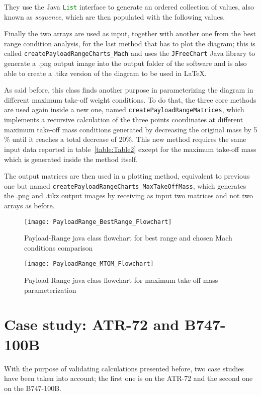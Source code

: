 They use the Java \lstinline[language=Java]!List! interface to generate an ordered collection of values, also known as \emph{sequence}, which are then populated with the following values.

\bigskip
Finally the two arrays are used as input, together with another one from the best range condition analysis, for the last method that has to plot the diagram; this is called \lstinline[language=Java]!createPayloadRangeCharts_Mach! and uses the \lstinline[language=Java]!JFreeChart! Java library to generate a .png output image into the output folder of the software and is also able to create a .tikz version of the diagram to be used in \LaTeX.

As said before, this class finds another purpose in parameterizing the diagram in different maximum take-off weight conditions. To do that, the three core methods are used again inside a new one, named \lstinline[language=Java]!createPayloadRangeMatrices!, which implements a recursive calculation of the three points coordinates at different maximum take-off mass conditions generated by decreasing the original mass by 5$\%$ until it reaches a total decrease of 20$\%$. This new method requires the same input data reported in table~\ref{table:Table2} except for the maximum take-off mass which is generated inside the method itself.

The output matrices are then used in a plotting method, equivalent to previous one but named \lstinline[language=Java]!createPayloadRangeCharts_MaxTakeOffMass!, which generates the .png and .tikz output images by receiving as input two matrices and not two arrays as before.

\bigskip
\begin{figure}[!ht]
\centering
\texttt{[image: PayloadRange\_BestRange\_Flowchart]}
\caption{Payload-Range java class flowchart for best range and chosen Mach conditions comparison}
\label{fig:Figure3}
\end{figure}

\bigskip
\begin{figure}[!ht]
\centering
\texttt{[image: PayloadRange\_MTOM\_Flowchart]}
\caption{Payload-Range java class flowchart for maximum take-off mass parameterization}
\label{fig:Figure4}
\end{figure}


\section{Case study: ATR-72 and B747-100B}
With the purpose of validating calculations presented before, two case studies have been taken into account; the first one is on the ATR-72 and the second one on the B747-100B.

